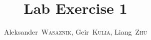 \documentclass[a4,journal,twoside]{IEEEtran}
\begin{document}
\title{Lab Exercise 1}
\author{Aleksander~\textsc{Wasaznik},
        Geir~\textsc{Kulia},
        Liang~\textsc{Zhu}}


\maketitle

\begin{abstract}
\blindtext[1]
\end{abstract}



\end{document}
